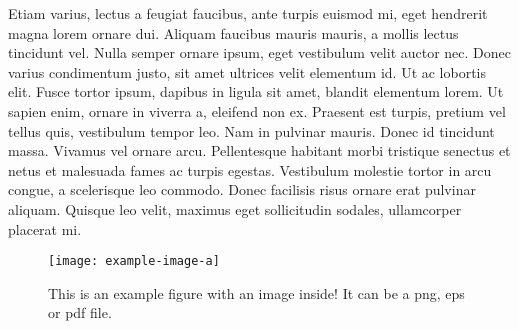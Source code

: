 	Etiam varius, lectus a feugiat faucibus, ante turpis euismod mi, eget hendrerit magna lorem ornare dui. Aliquam faucibus mauris mauris, a mollis lectus tincidunt vel. Nulla semper ornare ipsum, eget vestibulum velit auctor nec. Donec varius condimentum justo, sit amet ultrices velit elementum id. Ut ac lobortis elit. Fusce tortor ipsum, dapibus in ligula sit amet, blandit elementum lorem. Ut sapien enim, ornare in viverra a, eleifend non ex. Praesent est turpis, pretium vel tellus quis, vestibulum tempor leo. Nam in pulvinar mauris. Donec id tincidunt massa. Vivamus vel ornare arcu. Pellentesque habitant morbi tristique senectus et netus et malesuada fames ac turpis egestas. Vestibulum molestie tortor in arcu congue, a scelerisque leo commodo. Donec facilisis risus ornare erat pulvinar aliquam. Quisque leo velit, maximus eget sollicitudin sodales, ullamcorper placerat mi.

	\begin{figure}[ht]
		\centering
		\texttt{[image: example-image-a]}
		\caption{This is an example figure with an image inside! It can be a png, eps or pdf file.}
		\label{fig:example_figure}
	\end{figure}